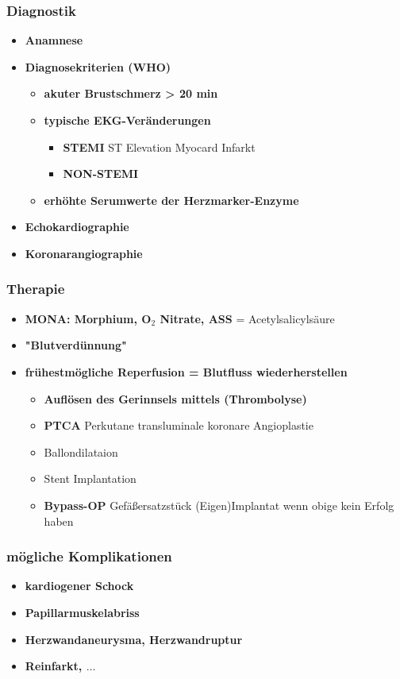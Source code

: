 		\subsubsection{Diagnostik}
			\begin{itemize}
				\item \textbf{Anamnese}
				\item \textbf{Diagnosekriterien (WHO)}
					\begin{itemize}
						\item \textbf{akuter Brustschmerz > 20 min}
						\item \textbf{typische EKG-Veränderungen}
							\begin{itemize}
								\item \textbf{STEMI} ST Elevation Myocard Infarkt
								\item \textbf{NON-STEMI}
							\end{itemize}
						\item \textbf{erhöhte Serumwerte der Herzmarker-Enzyme}
					\end{itemize}
				\item \textbf{Echokardiographie}
				\item \textbf{Koronarangiographie}
			\end{itemize}
		\subsubsection{Therapie}
			\begin{itemize}
				\item \textbf{MONA: Morphium, O$_2$ Nitrate, ASS} = Acetylsalicylsäure
				\item \textbf{"Blutverdünnung"}
				\item \textbf{frühestmögliche Reperfusion = Blutfluss wiederherstellen}
					\begin{itemize}
						\item \textbf{Auflösen des Gerinnsels mittels (Thrombolyse)}
						\item \textbf{PTCA} Perkutane transluminale koronare Angioplastie
						\item Ballondilataion
						\item Stent Implantation
						\item \textbf{Bypass-OP} Gefäßersatzstück (Eigen)Implantat wenn obige kein Erfolg haben
					\end{itemize}
			\end{itemize}
		\subsubsection{mögliche Komplikationen}
			\begin{itemize}
				\item \textbf{kardiogener Schock}
				\item \textbf{Papillarmuskelabriss}
				\item \textbf{Herzwandaneurysma, Herzwandruptur}
				\item \textbf{Reinfarkt, $\dots$}
			\end{itemize}
